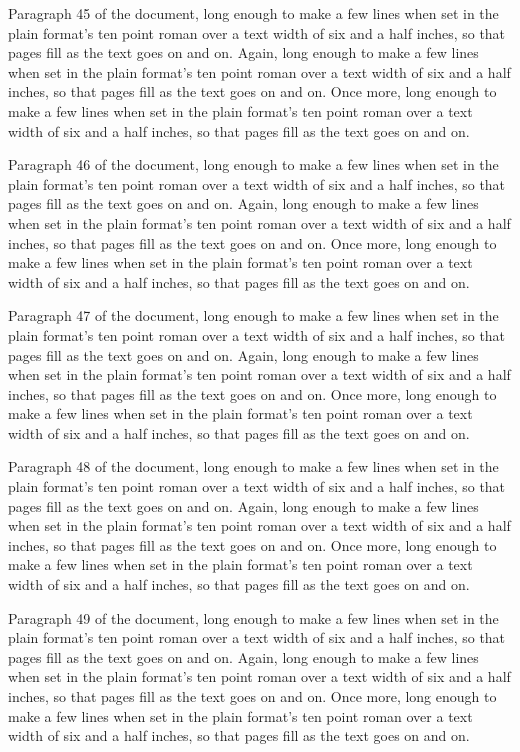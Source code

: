Paragraph 45 of the document, long enough to make a few lines when set in the plain format's ten point roman over a text width of six and a half inches, so that pages fill as the text goes on and on. Again, long enough to make a few lines when set in the plain format's ten point roman over a text width of six and a half inches, so that pages fill as the text goes on and on. Once more, long enough to make a few lines when set in the plain format's ten point roman over a text width of six and a half inches, so that pages fill as the text goes on and on.

Paragraph 46 of the document, long enough to make a few lines when set in the plain format's ten point roman over a text width of six and a half inches, so that pages fill as the text goes on and on. Again, long enough to make a few lines when set in the plain format's ten point roman over a text width of six and a half inches, so that pages fill as the text goes on and on. Once more, long enough to make a few lines when set in the plain format's ten point roman over a text width of six and a half inches, so that pages fill as the text goes on and on.

Paragraph 47 of the document, long enough to make a few lines when set in the plain format's ten point roman over a text width of six and a half inches, so that pages fill as the text goes on and on. Again, long enough to make a few lines when set in the plain format's ten point roman over a text width of six and a half inches, so that pages fill as the text goes on and on. Once more, long enough to make a few lines when set in the plain format's ten point roman over a text width of six and a half inches, so that pages fill as the text goes on and on.

Paragraph 48 of the document, long enough to make a few lines when set in the plain format's ten point roman over a text width of six and a half inches, so that pages fill as the text goes on and on. Again, long enough to make a few lines when set in the plain format's ten point roman over a text width of six and a half inches, so that pages fill as the text goes on and on. Once more, long enough to make a few lines when set in the plain format's ten point roman over a text width of six and a half inches, so that pages fill as the text goes on and on.

Paragraph 49 of the document, long enough to make a few lines when set in the plain format's ten point roman over a text width of six and a half inches, so that pages fill as the text goes on and on. Again, long enough to make a few lines when set in the plain format's ten point roman over a text width of six and a half inches, so that pages fill as the text goes on and on. Once more, long enough to make a few lines when set in the plain format's ten point roman over a text width of six and a half inches, so that pages fill as the text goes on and on.

